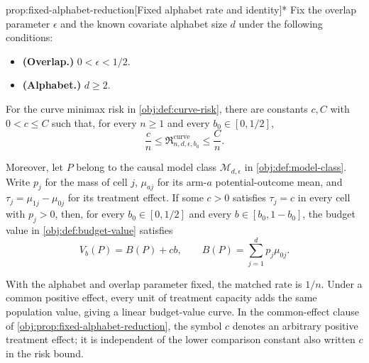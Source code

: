 \begin{propositionv}{prop:fixed-alphabet-reduction}[Fixed alphabet rate and identity]*
Fix the overlap parameter \(\epsilon\) and the known covariate alphabet size \(d\) under the following conditions:
\begin{itemize}
\item \textbf{(Overlap.)} \(0<\epsilon<1/2\).
\item \textbf{(Alphabet.)} \(d\ge 2\).
\end{itemize}
For the curve minimax risk in \cref{obj:def:curve-risk}, there are constants \(c,C\) with \(0<c\le C\) such that, for every \(n\ge1\) and every \(b_0\in[0,1/2]\),
\[
\frac{c}{n}\le
\mathfrak R_{n,d,\epsilon,b_0}^{\mathrm{curve}}
\le\frac{C}{n}.
\]

Moreover, let \(P\) belong to the causal model class \(\mathcal M_{d,\epsilon}\) in \cref{obj:def:model-class}. Write \(p_j\) for the mass of cell \(j\), \(\mu_{aj}\) for its arm-\(a\) potential-outcome mean, and \(\tau_j=\mu_{1j}-\mu_{0j}\) for its treatment effect. If some \(c>0\) satisfies \(\tau_j=c\) in every cell with \(p_j>0\), then, for every \(b_0\in[0,1/2]\) and every \(b\in[b_0,1-b_0]\), the budget value in \cref{obj:def:budget-value} satisfies
\[
V_b(P)=B(P)+cb,
\qquad
B(P)=\sum_{j=1}^{d}p_j\mu_{0j}.
\]
\end{propositionv}

With the alphabet and overlap parameter fixed, the matched rate is \(1/n\). Under a common positive effect, every unit of treatment capacity adds the same population value, giving a linear budget-value curve.
In the common-effect clause of \cref{obj:prop:fixed-alphabet-reduction}, the symbol \(c\) denotes an arbitrary positive treatment effect; it is independent of the lower comparison constant also written \(c\) in the risk bound.
